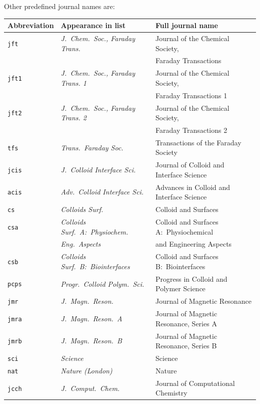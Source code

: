 \documentclass{article}
\begin{document}
\noindent Other predefined journal names are:\newline
\begin{tabular}{|lll|}
\hline
Abbreviation & Appearance in list & Full journal name \\ \hline
\texttt{jft} & \textit{J.~Chem.\ Soc., Faraday Trans.} & Journal of the
Chemical Society, \\ 
&  & \hfill Faraday Transactions \\ 
\texttt{jft1} & \textit{J.~Chem.\ Soc., Faraday Trans. 1} & Journal of the
Chemical Society, \\ 
&  & \hfill Faraday Transactions 1 \\ 
\texttt{jft2} & \textit{J.~Chem.\ Soc., Faraday Trans. 2} & Journal of the
Chemical Society, \\ 
&  & \hfill Faraday Transactions 2 \\ 
\texttt{tfs} & \textit{Trans.\ Faraday Soc.} & Transactions of the Faraday
Society \\ 
\texttt{jcis} & \textit{J.~Colloid Interface Sci.} & Journal of Colloid and
Interface Science \\ 
\texttt{acis} & \textit{Adv.~Colloid Interface Sci.} & Advances in Colloid
and Interface Science \\ 
\texttt{cs} & \textit{Colloids Surf.} & Colloid and Surfaces \\ 
\texttt{csa} & \textit{Colloids Surf.\ A:\ Physiochem.} & Colloid and
Surfaces A:\ Physiochemical \\ 
& \hfill \textit{Eng.\ Aspects} & and Engineering Aspects \\ 
\texttt{csb} & \textit{Colloids Surf.\ B:\ Biointerfaces} & Colloid and
Surfaces B:\ Biointerfaces \\ 
\texttt{pcps} & \textit{Progr.\ Colloid Polym.\ Sci.} & Progress in Colloid
and Polymer Science \\ 
\texttt{jmr} & \textit{J.~Magn.\ Reson.} & Journal of Magnetic Resonance \\ 
\texttt{jmra} & \textit{J.~Magn.\ Reson.\ A} & Journal of Magnetic
Resonance, Series A \\ 
\texttt{jmrb} & \textit{J.~Magn.\ Reson.\ B} & Journal of Magnetic
Resonance, Series B \\ 
\texttt{sci} & \textit{Science} & Science \\ 
\texttt{nat} & \textit{Nature (London)} & Nature \\ 
\texttt{jcch} & \textit{J.~Comput.\ Chem.} & Journal of Computational
Chemistry \\ 

\end{tabular}
\end{document}
